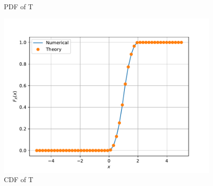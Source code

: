 \documentclass[journal,12pt,twocolumn]{IEEEtran}
\renewcommand\thesection{\arabic{section}}
\providecommand{\pr}[1]{\ensuremath{\Pr\left(#1\right)}}
\providecommand{\cbrak}[1]{\ensuremath{\left\{#1\right\}}}
\theoremstyle{remark}
\providecommand{\gauss}[2]{\mathcal{N}\ensuremath{\left(#1,#2\right)}}
\numberwithin{equation}{section}
\begin{document}
\begin{enumerate}[label=\thesection.\arabic*
,ref=\thesection.\theenumi]
\begin{figure}[h]
	 \caption{PDF of T}
	\label{fig:T_pdf}
\end{figure}
\begin{figure}[h]
	\centering
	\includegraphics[width=\columnwidth]{figs/4/T_cdf.pdf}
	 \caption{CDF of T}
	\label{fig:T_cdf}
\end{figure}
\end{enumerate}

\end{document}

